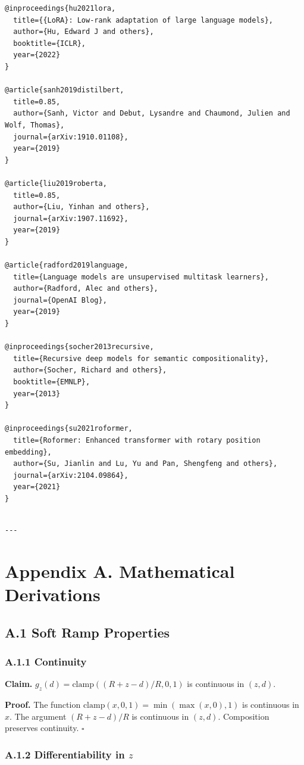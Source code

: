 \begin{lstlisting}
@inproceedings{hu2021lora,
  title={{LoRA}: Low-rank adaptation of large language models},
  author={Hu, Edward J and others},
  booktitle={ICLR},
  year={2022}
}

@article{sanh2019distilbert,
  title=0.85,
  author={Sanh, Victor and Debut, Lysandre and Chaumond, Julien and Wolf, Thomas},
  journal={arXiv:1910.01108},
  year={2019}
}

@article{liu2019roberta,
  title=0.85,
  author={Liu, Yinhan and others},
  journal={arXiv:1907.11692},
  year={2019}
}

@article{radford2019language,
  title={Language models are unsupervised multitask learners},
  author={Radford, Alec and others},
  journal={OpenAI Blog},
  year={2019}
}

@inproceedings{socher2013recursive,
  title={Recursive deep models for semantic compositionality},
  author={Socher, Richard and others},
  booktitle={EMNLP},
  year={2013}
}

@inproceedings{su2021roformer,
  title={Roformer: Enhanced transformer with rotary position embedding},
  author={Su, Jianlin and Lu, Yu and Pan, Shengfeng and others},
  journal={arXiv:2104.09864},
  year={2021}
}
\end{lstlisting}
\begin{lstlisting}

---
\end{lstlisting}


\section{Appendix A. Mathematical Derivations}

\subsection{A.1 Soft Ramp Properties}

\subsubsection{A.1.1 Continuity}

\textbf{Claim.} $g_z(d) = \text{clamp}((R + z - d) / R, 0, 1)$ is continuous in 
$(z, d)$.

\textbf{Proof.} The function $\text{clamp}(x, 0, 1) = \min(\max(x, 0), 1)$ is 
continuous in $x$. The argument $(R + z - d) / R$ is continuous in $(z, d)$. 
Composition preserves continuity. $\square$

\subsubsection{A.1.2 Differentiability in $z$}

